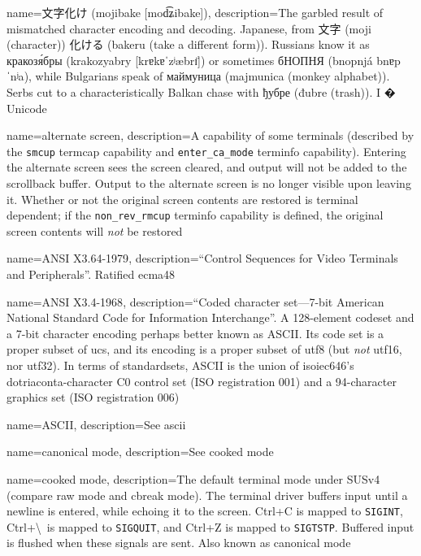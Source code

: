 {
  name={文字化け (mojibake [{mod͡ʑibake}])},
  description={The garbled result of mismatched
    character encoding and decoding. Japanese, from 文字 (moji (character))
    化ける (bakeru (take a different form)). Russians know it as \textrussian{кракозя́бры}
    (krakozyabry [{krɐkɐˈzʲæbrɪ̈}]) or sometimes
    \textrussian{бНОПНЯ} (bnopnjá {bnɐpˈnʲa}), while Bulgarians speak of \textbulgarian{маймуница}
    (majmunica (monkey alphabet)). Serbs cut to a characteristically
    Balkan chase with \textrussian{ђубре} (đubre (trash)). I {�} Unicode}
}

{
  name={alternate screen},
  description={A capability of some terminals (described by the \texttt{smcup}
    termcap capability and \texttt{enter\_ca\_mode} terminfo capability). 
    Entering the alternate screen sees the screen cleared, and output will not
    be added to the scrollback buffer. Output to the alternate screen is no
    longer visible upon leaving it. Whether or not the original screen contents
    are restored is terminal dependent; if the \texttt{non\_rev\_rmcup}
    terminfo capability is defined, the original screen contents will \textit{not}
    be restored}
}

{
  name={ANSI X3.64-1979},
  description={``Control Sequences for Video Terminals and Peripherals''.
    Ratified \Gls{ecma48}}
}

{
  name={ANSI X3.4-1968},
  description={``Coded character set---7-bit American National Standard Code
    for Information Interchange''. A 128-element codeset and a 7-bit character
    encoding perhaps better known as ASCII\cite{ascii}. Its code set is a
    proper subset of \Gls{ucs}, and its encoding is a proper subset of
    \gls{utf8} (but \textit{not} \gls{utf16}, nor \gls{utf32}). In terms of
    \gls{standardsets}, ASCII is the union of \Gls{isoiec646}'s
    dotriaconta-character \Gls{C0} control set (ISO registration 001) and
    a 94-character graphics set (ISO registration 006)}
}

{
  name={ASCII},
  description={See \Gls{ascii}}
}

{
  name={canonical mode},
  description={See \gls{cooked mode}}
}

{
  name={cooked mode},
description={The default terminal mode under SUSv4 (compare \gls{raw mode} and
\gls{cbreak mode}).
  The terminal driver buffers input until a newline is entered, while echoing
  it to the screen. Ctrl+C is mapped to \texttt{SIGINT}, Ctrl+\textbackslash\ is
  mapped to \texttt{SIGQUIT}, and Ctrl+Z is mapped to \texttt{SIGTSTP}.
  Buffered input is flushed when these signals are sent. Also known as
  \gls{canonical mode}}
}

